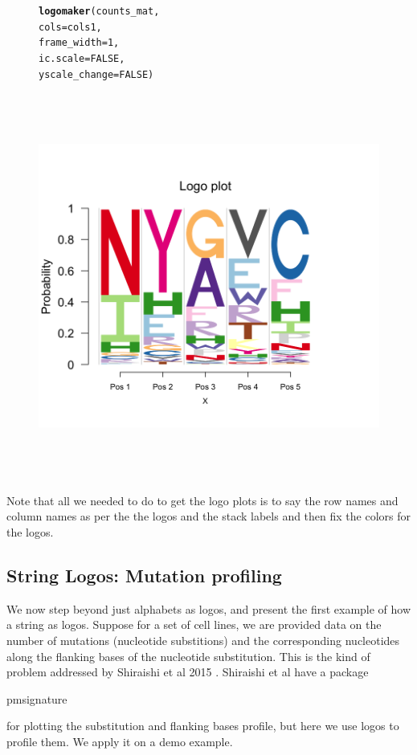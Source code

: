 \documentclass[12pt]{article}\usepackage[]{graphicx}\usepackage[usenames,dvipsnames]{color}
\makeatletter
\newcommand{\hlnum}[1]{\textcolor[rgb]{0.686,0.059,0.569}{#1}}%
\newcommand{\hlstd}[1]{\textcolor[rgb]{0.345,0.345,0.345}{#1}}%
\newcommand{\hlkwc}[1]{\textcolor[rgb]{0.333,0.667,0.333}{#1}}%
\newcommand{\hlkwd}[1]{\textcolor[rgb]{0.737,0.353,0.396}{\textbf{#1}}}%
\newenvironment{kframe}{%
 \def\at@end@of@kframe{}%
 \ifinner\ifhmode%
  \def\at@end@of@kframe{\end{minipage}}%
  \begin{minipage}{\columnwidth}%
 \fi\fi%
 \def\FrameCommand##1{\hskip\@totalleftmargin \hskip-\fboxsep
 \colorbox{shadecolor}{##1}\hskip-\fboxsep
     \hskip-\linewidth \hskip-\@totalleftmargin \hskip\columnwidth}%
 \MakeFramed {\advance\hsize-\width
   \@totalleftmargin\z@ \linewidth\hsize
   \@setminipage}}%
 {\par\unskip\endMakeFramed%
 \at@end@of@kframe}
\newenvironment{knitrout}{}{} %
\makeatother
\begin{document}
\begin{figure}[htp]
\begin{center}
\begin{knitrout}
\begin{kframe}
\begin{alltt}
\hlkwd{logomaker}\hlstd{(counts_mat,}
          \hlkwc{cols}\hlstd{= cols1,}
          \hlkwc{frame_width} \hlstd{=} \hlnum{1}\hlstd{,}
          \hlkwc{ic.scale}  \hlstd{=} \hlnum{FALSE}\hlstd{,}
          \hlkwc{yscale_change} \hlstd{=} \hlnum{FALSE}\hlstd{)}
\end{alltt}
\end{kframe}
\includegraphics[width=6in,height=5in]{figure/logolas_use_5-1} 

\end{knitrout}
\end{center}
\end{figure}

Note that all we needed to do to get the logo plots is to say the row names and column names as per the the logos and the stack labels and then fix the colors for the logos.

\newpage

\subsection{String Logos: Mutation profiling}

We now step beyond just alphabets as logos, and present the first example of how a string as logos. Suppose for a set of cell lines, we are provided data on the number of mutations (nucleotide substitions) and the corresponding nucleotides along the flanking bases of the nucleotide substitution. This is the kind of problem addressed by Shiraishi et al 2015 \cite{Shiraishi2015}. Shiraishi et al have a package \begin{verb} pmsignature \end{verb} for plotting the substitution and flanking bases profile, but here we use logos to profile them. We apply it on a demo example.
\end{document}
